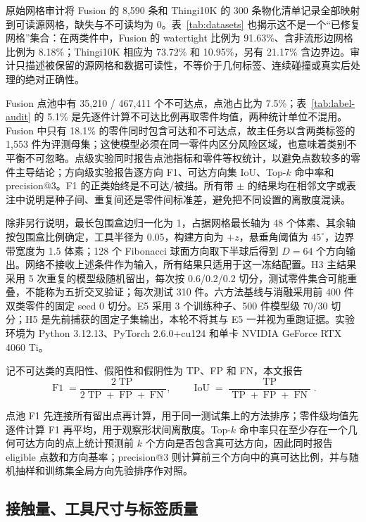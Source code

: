 原始网格审计将 Fusion 的 8,590 条和 Thingi10K 的 300 条物化清单记录全部映射到可读源网格，缺失与不可读均为 0。表~\ref{tab:datasets} 也揭示这不是一个“已修复网格”集合：在两类件中，Fusion 的 watertight 比例为 91.63\%、含非流形边网格比例为 8.18\%；Thingi10K 相应为 73.72\% 和 10.95\%，另有 21.17\% 含边界边。审计只描述被保留的源网格和数据可读性，不等价于几何标签、连续碰撞或真实后处理的绝对正确性。

Fusion 点池中有 35,210 / 467,411 个不可达点，点池占比为 7.5\%；表~\ref{tab:label-audit} 的 5.1\% 是先逐件计算不可达比例再取零件均值，两种统计单位不混用。Fusion 中只有 18.1\% 的零件同时包含可达和不可达点，故主任务以含两类标签的 1,553 件为评测母集；这使模型必须在同一零件内区分风险区域，也意味着类别不平衡不可忽略。点级实验同时报告点池指标和零件等权统计，以避免点数较多的零件主导结论；方向级实验报告逐方向 F1、可达方向集 IoU、Top-$k$ 命中率和 precision@3。F1 的正类始终是不可达/被挡。所有带 $\pm$ 的结果均在相邻文字或表注中说明是种子间、重复间还是零件间标准差，避免把不同设置的离散度混读。

除非另行说明，最长包围盒边归一化为 1，占据网格最长轴为 48 个体素、其余轴按包围盒比例确定，工具半径为 0.05，构建方向为 $+z$，悬垂角阈值为 $45^\circ$，边界带宽度为 1.5 体素；128 个 Fibonacci 球面方向取下半球后得到 $D=64$ 个方向输出。网络不接收上述条件作为输入，所有结果只适用于这一冻结配置。H3 主结果采用 5 次重复的模型级随机留出，每次按 0.6/0.2/0.2 切分，测试零件集合可能重叠，不能称为五折交叉验证；每次测试 310 件。六方法基线与消融采用前 400 件双类零件的固定 seed 0 切分。E5 采用 3 个训练种子、500 件模型级 70/30 切分；H5 是先前捕获的固定子集输出，本轮不将其与 E5 一并视为重跑证据。实验环境为 Python 3.12.13、PyTorch 2.6.0+cu124 和单卡 NVIDIA GeForce RTX 4060 Ti。

记不可达类的真阳性、假阳性和假阴性为 TP、FP 和 FN，本文报告
\begin{equation}
\operatorname{F1}=\frac{2\operatorname{TP}}{2\operatorname{TP}+\operatorname{FP}+\operatorname{FN}},\qquad
\operatorname{IoU}=\frac{\operatorname{TP}}{\operatorname{TP}+\operatorname{FP}+\operatorname{FN}}.
\label{eq:metrics}
\end{equation}

点池 F1 先连接所有留出点再计算，用于同一测试集上的方法排序；零件级均值先逐件计算 F1 再平均，用于观察形状间离散度。Top-$k$ 命中率只在至少存在一个几何可达方向的点上统计预测前 $k$ 个方向是否包含真可达方向，因此同时报告 eligible 点数和方向基率；precision@3 则计算前三个方向中的真可达比例，并与随机抽样和训练集全局方向先验排序作对照。

\subsection{接触量、工具尺寸与标签质量}

